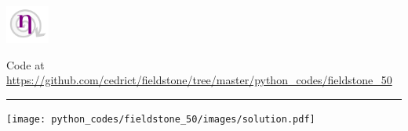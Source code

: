 
\includegraphics[height=1.25cm]{images/pictograms/nonlinear}



\begin{center}
Code at \url{https://github.com/cedrict/fieldstone/tree/master/python_codes/fieldstone_50}
\end{center}

\par\noindent\rule{\textwidth}{0.4pt}


\texttt{[image: python\_codes/fieldstone\_50/images/solution.pdf]}

